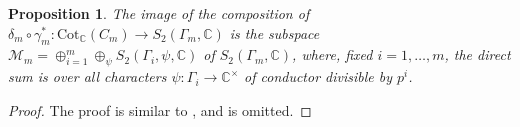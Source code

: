 \documentclass[a4paper,11pt]{amsart}
\numberwithin{equation}{section}
\theoremstyle{plain}
\newtheorem{proposition}[theorem]{Proposition}
\theoremstyle{definition}
\theoremstyle{remark}
\newcommand{\Q}{\mathbb{Q}}
\newcommand{\C}{\mathbb{C}}
\newcommand{\tr}{\mathrm{tr}}
\newcommand{\Cot}{\mathrm{Cot}}
\begin{document}
\begin{proposition}\label{prop3.1}
The image of the composition of $\delta_m\circ\gamma_m^*\colon \Cot_\C(C_m)\rightarrow S_2(\Gamma_m,\C)$ is the subspace $\mathcal{M}_m=\oplus_{i=1}^m\oplus_\psi S_2(\Gamma_i,\psi,\C)$ of $S_2(\Gamma_m,\C)$,
where, fixed $i=1,\dots,m$, the direct sum is over all characters $\psi\colon \Gamma_i\rightarrow\C^\times$ of conductor divisible by $p^i$. 
\end{proposition}

\begin{proof} 
The proof is similar to \cite[Proposition (4.1.8)]{OhtaC}, and is omitted. 

\end{proof}
\end{document}
